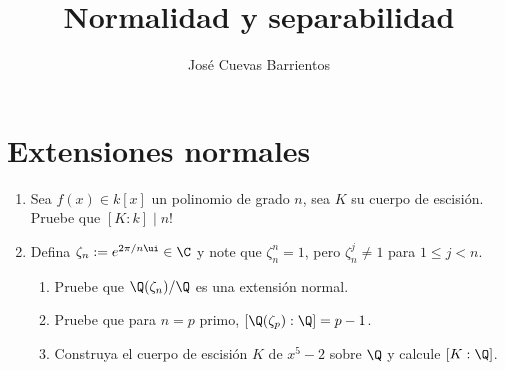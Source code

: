 \documentclass[11pt, reqno]{amsart}
\title{Normalidad y separabilidad}
\date{\DTMdate{2025-03-27}}
\author{José Cuevas Barrientos}
\begin{document}
\maketitle

\section{Extensiones normales}
\begin{enumerate}
	\item Sea $f(x) \in k[x]$ un polinomio de grado $n$, sea $K$ su cuerpo de escisión.
		Pruebe que $[K : k] \mid n!$

	\item Defina $\zeta_n := e^{2\pi/n \ui} \in \C$ y note que $\zeta_n^n = 1$, pero $\zeta_n^j \ne 1$ para $1 \le j
		< n$.
		\begin{enumerate}
			\item Pruebe que $\Q(\zeta_n)/\Q$ es una extensión normal.
			\item Pruebe que para $n = p$ primo, $[\Q(\zeta_p) : \Q] = p - 1$.
			\item Construya el cuerpo de escisión $K$ de $x^5 - 2$ sobre $\Q$ y calcule $[K : \Q]$.
		\end{enumerate}
\end{enumerate}
\end{document}
